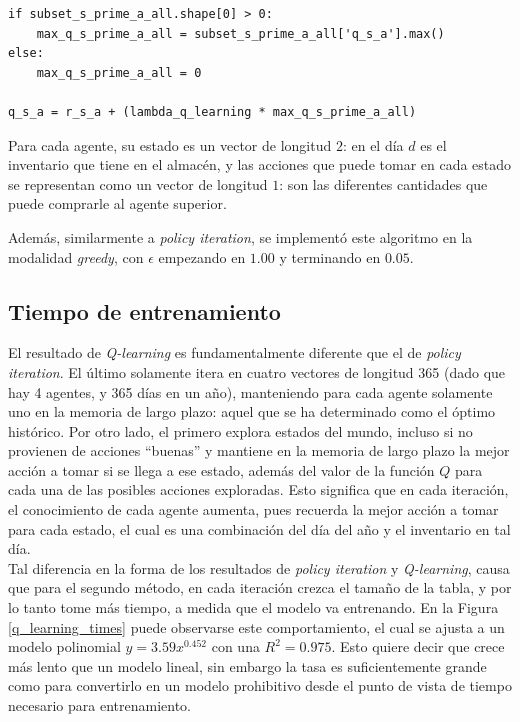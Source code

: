 \begin{enumerate}
\begin{verbatim}
if subset_s_prime_a_all.shape[0] > 0:
    max_q_s_prime_a_all = subset_s_prime_a_all['q_s_a'].max()
else:
    max_q_s_prime_a_all = 0

q_s_a = r_s_a + (lambda_q_learning * max_q_s_prime_a_all)
\end{verbatim}

Para cada agente, su estado es un vector de longitud $2$: en el d\'ia $d$ es el inventario que tiene en el almac\'en, y las acciones que puede tomar en cada estado se representan como un vector de longitud $1$: son las diferentes cantidades que puede comprarle al agente superior.
\end{enumerate}

Adem\'as, similarmente a \textit{policy iteration}, se implement\'o este algoritmo en la modalidad \textit{greedy}, con $\epsilon$ empezando en $1.00$ y terminando en $0.05$.

\subsection{Tiempo de entrenamiento}

El resultado de \textit{Q-learning} es fundamentalmente diferente que el de \textit{policy iteration}. El \'ultimo solamente itera en cuatro vectores de longitud 365 (dado que hay 4 agentes, y 365 d\'ias en un a\~no), manteniendo para cada agente solamente uno en la memoria de largo plazo: aquel que se ha determinado como el \'optimo hist\'orico. Por otro lado, el primero explora estados del mundo, incluso si no provienen de acciones ``buenas'' y mantiene en la memoria de largo plazo la mejor acci\'on a tomar si se llega a ese estado, adem\'as del valor de la funci\'on $Q$ para cada una de las posibles acciones exploradas. Esto significa que en cada iteraci\'on, el conocimiento de cada agente aumenta, pues recuerda la mejor acci\'on a tomar para cada estado, el cual es una combinaci\'on del d\'ia del a\~no y el inventario en tal d\'ia.\\

Tal diferencia en la forma de los resultados de \textit{policy iteration} y \textit{Q-learning}, causa que para el segundo m\'etodo, en cada iteraci\'on crezca el tama\~no de la tabla, y por lo tanto tome m\'as tiempo, a medida que el modelo va entrenando. En la Figura \ref{q_learning_times} puede observarse este comportamiento, el cual se ajusta a un modelo polinomial $y=3.59x^{0.452}$ con una $R^2=0.975$. Esto quiere decir que crece m\'as lento que un modelo lineal, sin embargo la tasa es suficientemente grande como para convertirlo en un modelo prohibitivo desde el punto de vista de tiempo necesario para entrenamiento.

